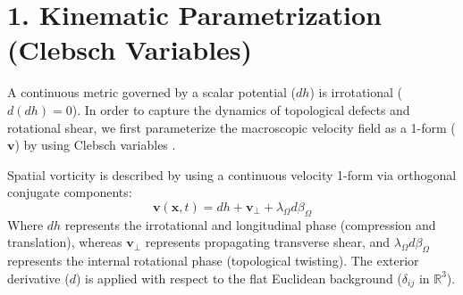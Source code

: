 \vspace{0.5cm}



\section*{1. Kinematic Parametrization (Clebsch Variables)}
A continuous metric governed by a scalar potential ($dh$) is irrotational ($d(dh) = 0$). In order to capture the dynamics of topological defects and rotational shear, we first parameterize the macroscopic velocity field as a 1-form ($\mathbf{v}$) by using Clebsch variables \cite{Clebsch1859}. 

Spatial vorticity is described by using a continuous velocity 1-form via orthogonal conjugate components:
\begin{equation}
    \mathbf{v}(\mathbf{x}, t) = dh + \mathbf{v}_{\perp} + \lambda_\Omega d\beta_\Omega \label{eq:tensor_velocity_field} 
\end{equation}
Where $dh$ represents the irrotational and longitudinal phase (compression and translation), whereas $\mathbf{v}_{\perp}$ represents propagating transverse shear, and $\lambda_\Omega d\beta_\Omega$ represents the internal rotational phase (topological twisting). The exterior derivative ($d$) is applied with respect to the flat Euclidean background ($\delta_{ij}$ in $\mathbb{R}^3$). 

